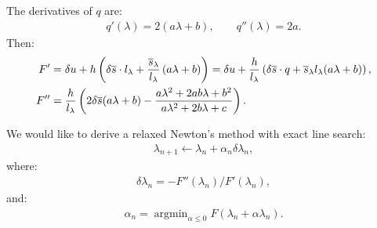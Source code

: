 \documentclass[eikonal.tex]{subfiles}
\begin{document}
The derivatives of $q$ are:
\begin{align*}
  q'(\lambda) = 2(a\lambda + b), \qquad q''(\lambda) = 2a.
\end{align*}
Then:
\begin{align*}
  F' &= \delta u + h\left(\delta\overline{s}\cdot{}l_\lambda + \frac{\overline{s}_\lambda}{l_\lambda} \left(a \lambda + b\right)\right) = \delta u + \frac{h}{l_\lambda} \left(\delta\overline{s}\cdot{}q + \overline{s}_\lambda l_\lambda (a \lambda + b)\right), \\
  F'' &= \frac{h}{l_\lambda} \left(2 \delta\overline{s} (a \lambda + b) - \frac{a \lambda^2 + 2ab \lambda + b^2}{a\lambda^2 + 2b \lambda + c}\right).
\end{align*}

We would like to derive a relaxed Newton's method with exact line
search:
\begin{align*}
  \lambda_{n+1} \gets \lambda_n + \alpha_n \delta \lambda_n,
\end{align*}
where:
\begin{align*}
  \delta \lambda_n = -F''(\lambda_n)/F'(\lambda_n),
\end{align*}
and:
\begin{align*}
  \alpha_n = \operatorname{argmin}_{\alpha \leq 0} F(\lambda_n + \alpha \lambda_n).
\end{align*}
\end{document}
